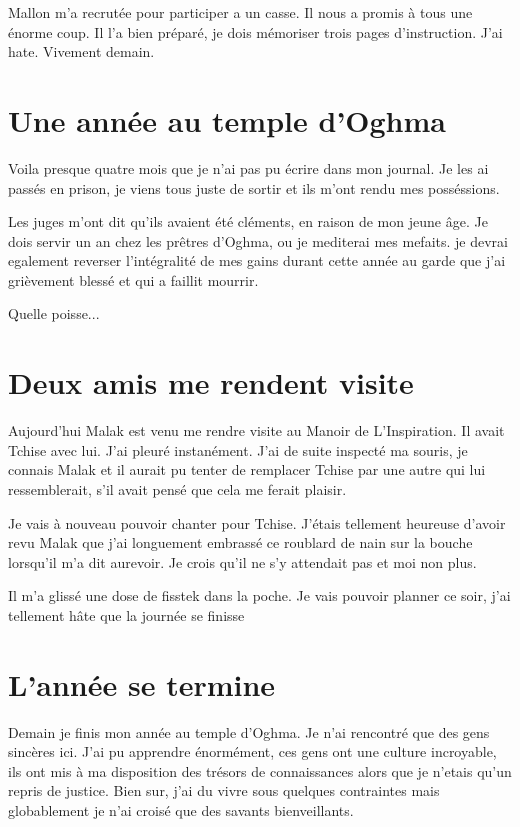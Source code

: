 \documentclass[10pt,a4paper,twoside,twocolumn,openany]{book}
\begin{document}
Mallon m'a recrutée pour participer a un casse. Il nous a promis à tous une énorme coup. Il l'a bien 
préparé, je dois mémoriser trois pages d'instruction. J'ai hate. Vivement demain.

\section{Une année au temple d'Oghma}

Voila presque quatre mois que je n'ai pas pu écrire dans mon journal. Je les ai
passés en prison, je viens tous juste de sortir et ils m'ont rendu mes posséssions.
 
Les juges m'ont dit qu'ils avaient été cléments, en raison de mon jeune âge. Je dois servir un an
chez les prêtres d'Oghma, ou je mediterai mes mefaits. je devrai egalement reverser l'intégralité 
de mes gains durant cette année au garde que j'ai grièvement blessé et qui a faillit mourrir.

Quelle poisse...

\section{Deux amis me rendent visite}

Aujourd'hui Malak est venu me rendre visite au Manoir de L'Inspiration.
Il avait Tchise avec lui. J'ai pleuré instanément.
J'ai de suite inspecté ma souris, je connais Malak et il aurait pu tenter de remplacer Tchise par une autre
qui lui ressemblerait, s'il avait pensé que cela me ferait plaisir. 

Je vais à nouveau pouvoir chanter pour Tchise. J'étais tellement heureuse d'avoir revu
Malak que j'ai longuement embrassé ce roublard de nain sur la bouche lorsqu'il m'a dit aurevoir. Je crois qu'il ne s'y 
attendait pas et moi non plus.

Il m'a glissé une dose de fisstek dans la poche. Je vais pouvoir planner ce soir, j'ai tellement hâte que la journée 
se finisse

\section{L'année se termine}
Demain je finis mon année au temple d'Oghma. Je n'ai rencontré que des gens sincères ici.
J'ai pu apprendre énormément, ces gens ont une culture incroyable, ils ont mis à ma 
disposition des trésors de connaissances alors que je n'etais qu'un repris de justice.
Bien sur, j'ai du vivre sous quelques contraintes mais globablement je n'ai croisé
que des savants bienveillants.
\end{document}

